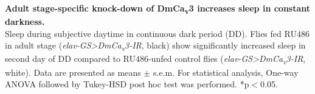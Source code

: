 \label{fig:S}
\textbf{Adult stage-specific knock-down of DmCa\textsubscript{v}3 increases sleep in constant darkness.}
\\
Sleep during subjective daytime in continuous dark period (DD). 
Flies fed RU486 in adult stage (\emph{elav-GS\textgreater{}DmCa\textsubscript{v}3-IR}, black) show significantly increased sleep in second day of DD compared to RU486-unfed control flies (\emph{elav-GS\textgreater{}DmCa\textsubscript{v}3-IR}, white).
Data are presented as means $\pm$ s.e.m.
For statistical analysis, One-way ANOVA followed by Tukey-HSD post hoc test was performed.
*p$<$0.05.
  
  
  